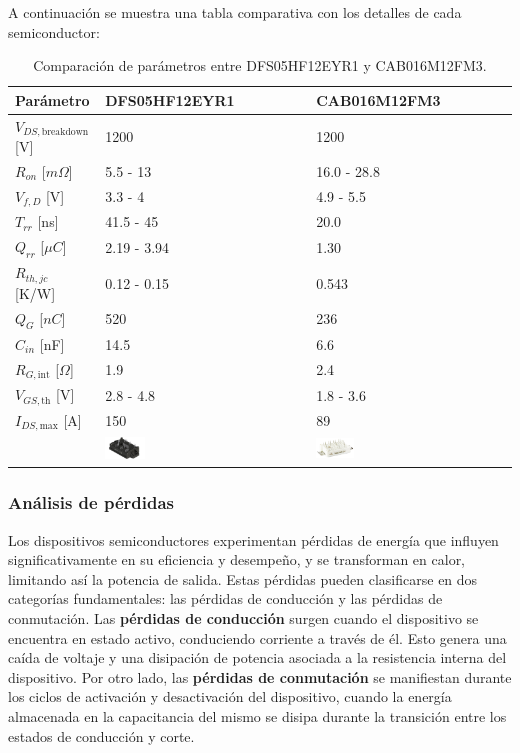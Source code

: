 A continuación se muestra una tabla comparativa con los detalles de cada semiconductor:
\begin{table}[H]
	\centering
	\begin{tabular}{|l|l|l|}
		\hline
		\textbf{Parámetro} & \textbf{DFS05HF12EYR1} & \textbf{CAB016M12FM3} \\ \hline
		\(V_{DS,\text{breakdown}}\) [V] & 1200 & 1200 \\ \hline
		\(R_{on}\) [\(m \Omega\)] & 5.5 - 13 & 16.0 - 28.8 \\ \hline
		\(V_{f,D}\) [V] & 3.3 - 4 & 4.9 - 5.5 \\ \hline
		\(T_{rr}\) [ns] & 41.5 - 45 & 20.0 \\ \hline
		\(Q_{rr}\) [\(\mu C\)] & 2.19 - 3.94 & 1.30 \\ \hline
		\(R_{th,jc}\) [K/W] & 0.12 - 0.15 & 0.543 \\ \hline
		\(Q_{G}\) [\(nC\)] & 520 & 236 \\ \hline
		\(C_{in}\) [nF] & 14.5 & 6.6 \\ \hline
		\(R_{G,\text{int}}\) [\(\Omega\)] & 1.9 & 2.4 \\ \hline
		\(V_{GS,\text{th}}\) [V] & 2.8 - 4.8 & 1.8 - 3.6 \\ \hline
		\(I_{DS,\text{max}}\) [A] & 150 & 89 \\ \hline
		& \includegraphics[width=0.2\textwidth]{fig/DFS05.png} & \includegraphics[width=0.2\textwidth]{fig/CAB016.png} \\
		\hline
	\end{tabular}
	\caption{Comparación de parámetros entre DFS05HF12EYR1 y CAB016M12FM3.}
\end{table}

\subsubsection{Análisis de pérdidas}

Los dispositivos semiconductores experimentan pérdidas de energía que influyen significativamente en su eficiencia y desempeño, y se transforman en calor, limitando así la potencia de salida. Estas pérdidas pueden clasificarse en dos categorías fundamentales: las pérdidas de conducción y las pérdidas de conmutación. Las \textbf{pérdidas de conducción} surgen cuando el dispositivo se encuentra en estado activo, conduciendo corriente a través de él. Esto genera una caída de voltaje y una disipación de potencia asociada a la resistencia interna del dispositivo. Por otro lado, las \textbf{pérdidas de conmutación} se manifiestan durante los ciclos de activación y desactivación del dispositivo, cuando la energía almacenada en la capacitancia del mismo se disipa durante la transición entre los estados de conducción y corte.

